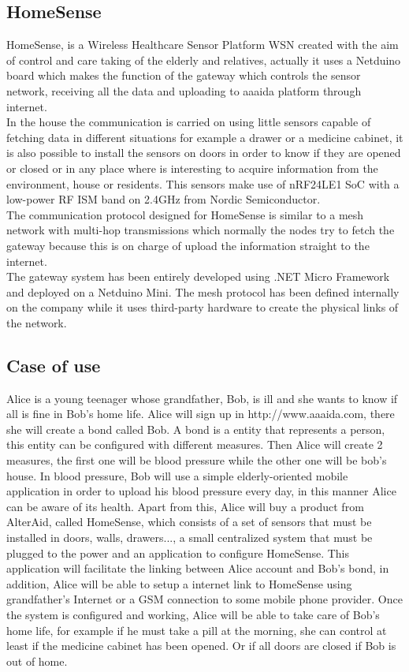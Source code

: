 \subsection{HomeSense}\label{SS:HomeSense-proposal}
HomeSense, is a Wireless Healthcare Sensor Platform \gls{WSN} created with the aim of control and care taking of the elderly and relatives, actually it uses a Netduino board which makes the function of the gateway which controls the sensor network, receiving all the data and uploading to aaaida platform through internet.
\\
In the house the communication is carried on using little sensors capable of fetching data in different situations for example a drawer or a medicine cabinet, it is also possible to install the sensors on doors in order to know if they are opened or closed or in any place where is interesting to acquire information from the environment, house or residents. This sensors make use of nRF24LE1 \gls{SoC} with a low-power RF \gls{ISM} band on 2.4GHz from Nordic Semiconductor.
\\
The communication protocol designed for HomeSense is similar to a mesh network with multi-hop transmissions which normally the nodes try to fetch the gateway because this is on charge of upload the information straight to the internet.
\\
The gateway system has been entirely developed using .NET Micro Framework and deployed on a Netduino Mini. The mesh protocol has been defined internally on the company while it uses third-party hardware to create the physical links of the network.

\subsection{Case of use}\label{SS:Case-Of-Use}
Alice is a young teenager whose grandfather, Bob, is ill and she wants to know if all is fine in Bob's home life. Alice will sign up in http://www.aaaida.com, there she will create a bond called Bob. A bond is a entity that represents a person, this entity can be configured with different measures. Then Alice will create 2 measures, the first one will be blood pressure while the other one will be bob's house.
In blood pressure, Bob will use a simple elderly-oriented mobile application in order to upload his blood pressure every day, in this manner Alice can be aware of its health.
Apart from this, Alice will buy a product from AlterAid, called HomeSense, which consists of a set of sensors that must be installed in doors, walls, drawers..., a small centralized system that must be plugged to the power and an application to configure HomeSense.
This application will facilitate the linking between Alice account and Bob's bond, in addition, Alice will be able to setup a internet link to HomeSense using grandfather's Internet or a GSM connection to some mobile phone provider.
Once the system is configured and working, Alice will be able to take care of Bob's home life, for example if he must take a pill at the morning, she can control at least if the medicine cabinet has been opened. Or if all doors are closed if Bob is out of home.


